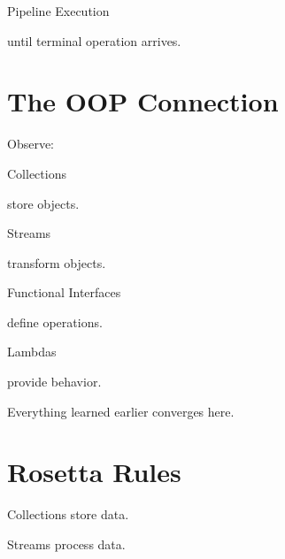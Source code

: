 \documentclass[11pt,a4paper]{book}
\begin{document}

Pipeline Execution


until terminal operation arrives.


\section{The OOP Connection}

Observe:


Collections

store objects.


Streams

transform objects.


Functional Interfaces

define operations.


Lambdas

provide behavior.


Everything learned earlier
converges here.


\section{Rosetta Rules}

\begin{rosettarule}

Collections store data.

\end{rosettarule}


\begin{rosettarule}

Streams process data.

\end{rosettarule}
\end{document}
